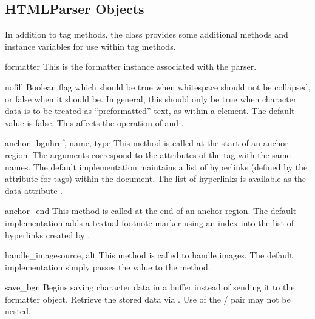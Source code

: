 \subsection{HTMLParser Objects \label{html-parser-objects}}

In addition to tag methods, the  class provides some
additional methods and instance variables for use within tag methods.

\begin{memberdesc}{formatter}
This is the formatter instance associated with the parser.
\end{memberdesc}

\begin{memberdesc}{nofill}
Boolean flag which should be true when whitespace should not be
collapsed, or false when it should be.  In general, this should only
be true when character data is to be treated as ``preformatted'' text,
as within a  element.  The default value is false.  This
affects the operation of  and .
\end{memberdesc}


\begin{methoddesc}{anchor_bgn}{href, name, type}
This method is called at the start of an anchor region.  The arguments
correspond to the attributes of the  tag with the same
names.  The default implementation maintains a list of hyperlinks
(defined by the  attribute for  tags) within the
document.  The list of hyperlinks is available as the data attribute
.
\end{methoddesc}

\begin{methoddesc}{anchor_end}{}
This method is called at the end of an anchor region.  The default
implementation adds a textual footnote marker using an index into the
list of hyperlinks created by .
\end{methoddesc}

\begin{methoddesc}{handle_image}{source, alt}
This method is called to handle images.  The default implementation
simply passes the  value to the 
method.
\end{methoddesc}

\begin{methoddesc}{save_bgn}{}
Begins saving character data in a buffer instead of sending it to the
formatter object.  Retrieve the stored data via .
Use of the  /  pair may not be
nested.
\end{methoddesc}


